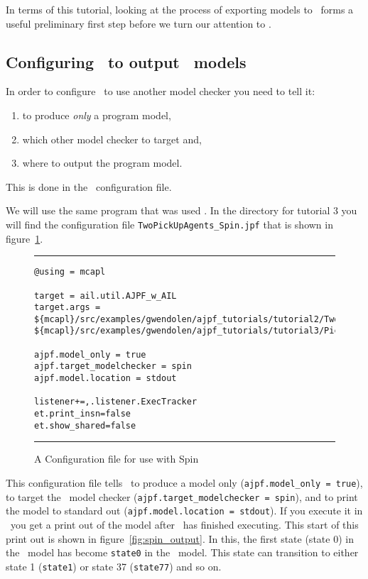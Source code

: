 In terms of this tutorial, looking at the process of exporting models to \spin\ forms a useful preliminary first step before we turn our attention to \prism.

\subsection{Configuring \ajpf\ to output \spin\ models}
\label{sec:configure_spin}

In order to configure \ajpf\ to use another model checker you need to tell it:
\begin{enumerate}
\item to produce \emph{only} a program model, 
\item which other model checker to target and, 
\item where to output the program model.
\end{enumerate}  This is done in the \ajpf\ configuration file.  

We will use the same program that was used .  In the directory for tutorial 3 you will find the configuration file \texttt{TwoPickUpAgents\_Spin.jpf} that is shown in figure~\ref{fig:spin_config}.

\begin{figure}[htb]
\noindent\rule{\textwidth}{1pt}
\begin{small}
\begin{verbatim}
@using = mcapl

target = ail.util.AJPF_w_AIL
target.args = ${mcapl}/src/examples/gwendolen/ajpf_tutorials/tutorial2/TwoPickUpAgents.ail,
${mcapl}/src/examples/gwendolen/ajpf_tutorials/tutorial3/PickUpAgent.psl,1

ajpf.model_only = true
ajpf.target_modelchecker = spin
ajpf.model.location = stdout

listener+=,.listener.ExecTracker
et.print_insn=false
et.show_shared=false
\end{verbatim}
\end{small}
\rule{\textwidth}{1pt}
\caption{A Configuration file for use with Spin}
\label{fig:spin_config}
\end{figure}

\begin{sloppypar}
This configuration file tells \ajpf\ to produce a model only (\texttt{ajpf.model\_only = true}), to target the \spin\ model checker (\texttt{ajpf.target\_modelchecker = spin}), and to print the model to standard out (\texttt{ajpf.model.location = stdout}).  If you execute it in \ajpf\ you get a print out of the model after \ajpf\  has finished executing.  This start of this print out is shown in figure~\ref{fig:spin_output}.
In this, the first state (state 0) in the \ajpf\ model has become \texttt{state0} in the \promela\ model.  This state can transition to either state 1 (\texttt{state1}) or state 37 (\texttt{state77}) and so on.
\end{sloppypar}

